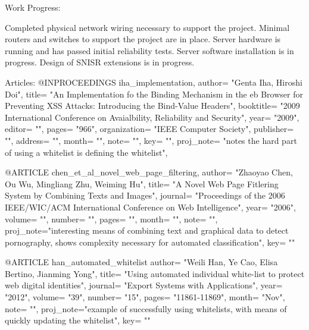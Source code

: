 Work Progress:

Completed physical network wiring necessary to support the project.
Minimal routers and switches to support the project are in place.
Server hardware is running and has passed initial reliability tests.
Server software installation is in progress.
Design of SNISR extensions is in progress.


Articles:
@INPROCEEDINGS { iha_implementation,
   author= "Genta Iha, Hiroshi Doi",
   title= "An Implementation fo the Binding Mechanism in the eb Browser for
Preventing XSS Attacks: Introducing the Bind-Value Headers",
   booktitle= "2009 International Conference on Avaialbility, Reliability
and Security",
   year= "2009",
   editor= "",
   pages= "966",
   organization= "IEEE Computer Society",
   publisher= "",
   address= "",
   month= "",
   note= "",
   key= "",
   proj_note= "notes the hard part of using a whitelist is defining the
whitelist", }

@ARTICLE { chen_et_al_novel_web_page_filtering, 
   author= "Zhaoyao Chen, Ou Wu, Mingliang Zhu, Weiming Hu",
   title= "A Novel Web Page Fitlering System by Combining Texts and Images",
   journal= "Proceedings of the 2006 IEEE/WIC/ACM International Conference
on Web Intelligence",
   year= "2006",
   volume= "",
   number= "",
   pages= "",
   month= "",
   note= "",
   proj_note="interesting means of combining text and graphical data to
detect pornography, shows complexity necessary for automated classification",
   key= "" }

@ARTICLE { han_automated_whitelist
   author= "Weili Han, Ye Cao, Elisa Bertino, Jianming Yong",
   title= "Using automated individual white-list to protect web digital
identities",
   journal= "Export Systems with Applications",
   year= "2012",
   volume= "39",
   number= "15",
   pages= "11861-11869",
   month= "Nov",
   note= "",
   proj_note="example of successfully using whitelists, with means of
quickly updating the whitelist",
   key= "" }


